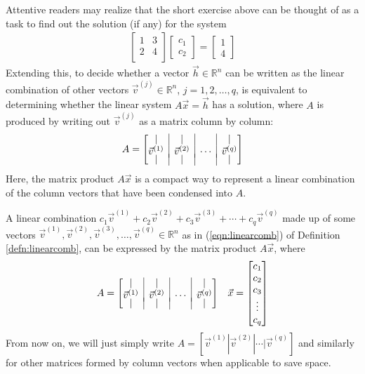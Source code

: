 Attentive readers may realize that the short exercise above can be thought of as a task to find out the solution (if any) for the system
\begin{align*}
\begin{bmatrix}
1 & 3 \\
2 & 4 \\
\end{bmatrix}
\begin{bmatrix}
c_1 \\
c_2
\end{bmatrix} =
\begin{bmatrix}
1 \\
4
\end{bmatrix}
\end{align*}
Extending this, to decide whether a vector $\vec{h} \in \mathbb{R}^n$ can be written as the linear combination of other vectors $\vec{v}^{(j)} \in \mathbb{R}^n$, $j = 1, 2, \ldots, q$, is equivalent to determining whether the linear system $A\vec{x} = \vec{h}$ has a solution, where $A$ is produced by writing out $\vec{v}^{(j)}$ as a matrix column by column:
\begin{align*}
A = \left[\begin{array}{@{}c|c|c|c@{}}
| & | & & | \\
\vec{v}^{(1)} & \vec{v}^{(2)} & \cdots & \vec{v}^{(q)} \\[-4pt]
| & | & & |
\end{array}\right]
\end{align*}
Here, the matrix product $A\vec{x}$ is a compact way to represent a linear combination of the column vectors that have been condensed into $A$.
\begin{proper}
\label{proper:linearcombmatrix}
A linear combination $c_1\vec{v}^{(1)} + c_2\vec{v}^{(2)} + c_3\vec{v}^{(3)} + \cdots + c_q\vec{v}^{(q)}$ made up of some vectors $\vec{v}^{(1)}, \vec{v}^{(2)}, \vec{v}^{(3)}, \ldots, \vec{v}^{(q)} \in \mathbb{R}^n$ as in (\ref{eqn:linearcomb}) of Definition \ref{defn:linearcomb}, can be expressed by the matrix product $A\vec{x}$, where
\begin{align}
&A = \left[\begin{array}{@{}c|c|c|c@{}}
| & | & & | \\
\vec{v}^{(1)} & \vec{v}^{(2)} & \cdots & \vec{v}^{(q)} \\[-4pt]
| & | & & |
\end{array}\right]
&\vec{x} =
\begin{bmatrix}
c_1 \\
c_2 \\
c_3 \\
\vdots \\
c_q
\end{bmatrix}
\end{align}
From now on, we will just simply write $A = [\vec{v}^{(1)} | \vec{v}^{(2)} | \cdots | \vec{v}^{(q)}]$ and similarly for other matrices formed by column vectors when applicable to save space.
\end{proper}
